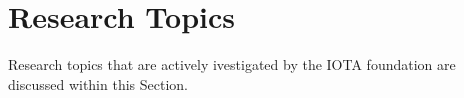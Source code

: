 \chapter{Research Topics}
Research topics that are actively ivestigated by the IOTA foundation are discussed within this Section.





